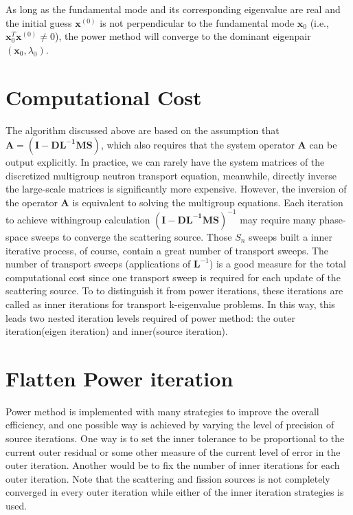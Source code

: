 As long as the fundamental mode and its corresponding eigenvalue are real and the initial guess $\mathbf{x}^{(0)}$ is not perpendicular to the fundamental mode $\mathbf{x}_0$ (i.e., $\mathbf{x}^T_0\mathbf{x}^{(0)} \neq 0$), the power method will converge to the dominant eigenpair $(\mathbf{x}_0, \lambda_0)$.

\section{Computational Cost}
The algorithm discussed above are based on the assumption that $\mathbf{A} =  \mathbf{(I - DL^{-1}MS)}$, which also requires that the system operator $\mathbf{A}$ can be output explicitly. 
In practice, we can rarely have the system matrices of the discretized multigroup neutron transport equation, meanwhile, directly inverse the large-scale matrices is significantly more expensive.
However, the inversion of the operator $\mathbf{A}$ is equivalent to solving the multigroup equations. 
Each iteration to achieve withingroup calculation $\mathbf{(I - DL^{-1}MS)}^{-1}$ may require many phase-space sweeps to converge the scattering source.
Those $S_n$ sweeps built a inner iterative process, of course, contain a great number of transport sweeps. 
The number of transport sweeps (applications of $\mathbf{L}^{-1}$) is a good measure for the total computational cost since one transport sweep is required for each update of the scattering source.
To to distinguish it from power iterations, these iterations are called as inner iterations for transport k-eigenvalue problems.
In this way, this leads two nested iteration levels required of power method: the outer iteration(eigen iteration) and inner(source iteration).

\section{Flatten Power iteration}
Power method is implemented with many strategies to improve the overall efficiency, and one possible way is achieved by varying the level of precision of source iterations.
One way is to set the inner tolerance to be proportional to the current outer residual or some other measure of the current level of error in the outer iteration.
Another would be to fix the number of inner iterations for each outer iteration.
Note that the scattering and fission sources is not completely converged in every outer iteration while either of the inner iteration strategies is used.
\citep{gill_newtons_2011}


